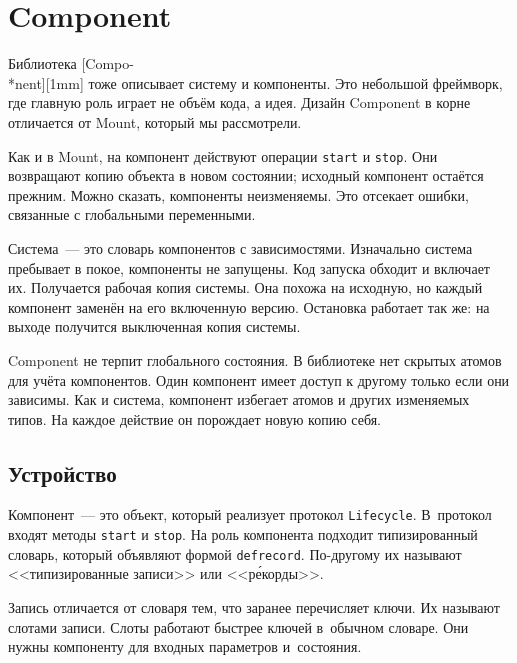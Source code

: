 \section{Component}


Библиотека [Compo-\\*nent][1mm] тоже
описывает систему и компоненты. Это небольшой фреймворк, где главную роль играет
не объём кода, а идея. Дизайн Component в корне отличается от Mount, который мы
рассмотрели.


Как и в Mount, на компонент действуют операции \verb|start| и \verb|stop|. Они
возвращают копию объекта в новом состоянии; исходный компонент остаётся
прежним. Можно сказать, компоненты неизменяемы. Это отсекает ошибки, связанные с
глобальными переменными.

Система~--- это словарь компонентов с зависимостями. Изначально система
пребывает в покое, компоненты не запущены. Код запуска обходит и включает
их. Получается рабочая копия системы. Она похожа на исходную, но каждый
компонент заменён на его включенную версию. Остановка работает так же: на выходе
получится выключенная копия системы.

Component не терпит глобального состояния. В библиотеке нет скрытых атомов для
учёта компонентов. Один компонент имеет доступ к другому только если они
зависимы. Как и система, компонент избегает атомов и других изменяемых типов. На
каждое действие он порождает новую копию себя.

\subsection{Устройство}

\label{defrecord}

Компонент~--- это объект, который реализует протокол \verb|Lifecycle|. В~протокол
входят методы \verb|start| и \verb|stop|. На роль компонента подходит
типизированный словарь, который объявляют формой \verb|defrecord|. По-другому их
называют <<типизированные записи>> или <<р\'{е}корды>>.


Запись отличается от словаря тем, что заранее перечисляет ключи. Их называют
слотами записи. Слоты работают быстрее ключей в~обычном словаре. Они нужны
компоненту для входных параметров и~состояния.

